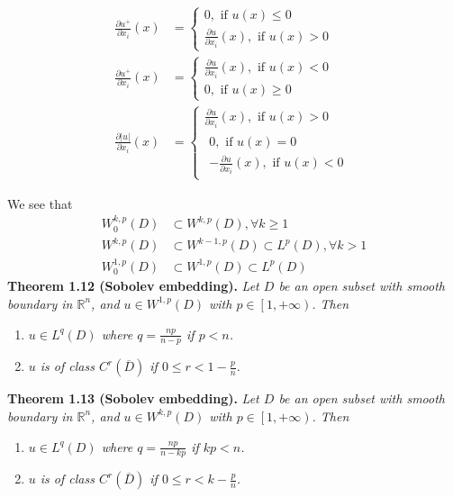 \documentclass[a4paper]{article}
\numberwithin{equation}{section}
\begin{document}
\begin{align}
\frac{{\partial {u^ + }}}{{\partial {x_i}}}\left( x \right) &= \left\{ {\begin{array}{*{20}{c}}
{0,\mbox{ if } u\left( x \right) \le 0}\\
{\frac{{\partial u}}{{\partial {x_i}}}\left( x \right),\mbox{ if } u\left( x \right) > 0}
\end{array}} \right.\\
\frac{{\partial {u^ + }}}{{\partial {x_i}}}\left( x \right) &= \left\{ {\begin{array}{*{20}{c}}
{\frac{{\partial u}}{{\partial {x_i}}}\left( x \right),\mbox{ if } u\left( x \right) < 0}\\
{0,\mbox{ if } u\left( x \right) \ge 0}
\end{array}} \right.\\
\frac{{\partial \left| u \right|}}{{\partial {x_i}}}\left( x \right) &= \left\{ {\begin{array}{*{20}{c}}
{\frac{{\partial u}}{{\partial {x_i}}}\left( x \right),\mbox{ if } u\left( x \right) > 0}\\
\begin{array}{l}
0,\mbox{ if } u\left( x \right) = 0\\
 - \frac{{\partial u}}{{\partial {x_i}}}\left( x \right),\mbox{ if } u\left( x \right) < 0
\end{array}
\end{array}} \right.
\end{align}

We see that
\begin{align}
W_0^{k,p}\left( D \right) &\subset {W^{k,p}}\left( D \right),\forall k \ge 1\\
{W^{k,p}}\left( D \right) &\subset {W^{k - 1,p}}\left( D \right) \subset {L^p}\left( D \right),\forall k > 1\\
W_0^{1,p}\left( D \right) &\subset {W^{1,p}}\left( D \right) \subset {L^p}\left( D \right)
\end{align}
\textbf{Theorem 1.12 (Sobolev embedding).} \textit{Let $D$ be an open subset with smooth boundary in $\mathbb{R}^n$, and $u\in W^{1,p}\left(D\right)$ with $p\in \left[1,+\infty\right)$. Then}
\begin{enumerate}
\item \textit{$u \in L^q\left(D\right)$ where $q = \frac{{np}}{{n - p}}$ if $p < n$.}
\item \textit{$u$ is of class $C^r\left(\overline{D}\right)$ if $0 \le r < 1 - \frac{p}{n}$.}
\end{enumerate}
\textbf{Theorem 1.13 (Sobolev embedding).} \textit{Let $D$ be an open subset with smooth boundary in $\mathbb{R}^n$, and $u\in W^{k,p}\left(D\right)$ with $p\in \left[1,+\infty\right)$. Then}
\begin{enumerate}
\item \textit{$u \in L^q\left(D\right)$ where $q = \frac{{np}}{{n - kp}}$ if $kp < n$.}
\item \textit{$u$ is of class $C^r\left(\overline{D}\right)$ if $0 \le r < k - \frac{p}{n}$.}
\end{enumerate}
\end{document}
